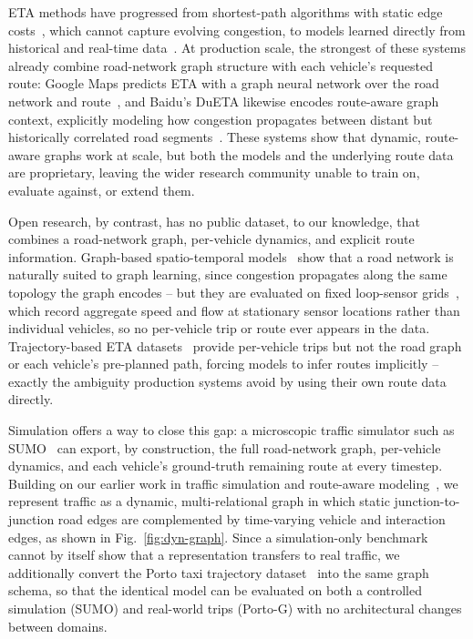 \documentclass[pdflatex,sn-basic,Numbered]{sn-jnl}%
\begin{document}
ETA methods have progressed from shortest-path algorithms with static edge costs~\cite{dijkstra1959}, which cannot capture evolving congestion, to models learned directly from historical and real-time data~\cite{chen2016xgboost,deepTTE2018,wang2022metatte}. At production scale, the strongest of these systems already combine road-network graph structure with each vehicle's requested route: Google Maps predicts ETA with a graph neural network over the road network and route~\cite{derrowpinion2021googlemaps}, and Baidu's DuETA likewise encodes route-aware graph context, explicitly modeling how congestion propagates between distant but historically correlated road segments~\cite{dueta2023}. These systems show that dynamic, route-aware graphs work at scale, but both the models and the underlying route data are proprietary, leaving the wider research community unable to train on, evaluate against, or extend them.

Open research, by contrast, has no public dataset, to our knowledge, that combines a road-network graph, per-vehicle dynamics, and explicit route information. Graph-based spatio-temporal models~\cite{dcrnn2018,yu2018stgcn,wu2019graphwavenet} show that a road network is naturally suited to graph learning, since congestion propagates along the same topology the graph encodes -- but they are evaluated on fixed loop-sensor grids~\cite{li2018_metrla,pemsbay}, which record aggregate speed and flow at stationary sensor locations rather than individual vehicles, so no per-vehicle trip or route ever appears in the data. Trajectory-based ETA datasets~\cite{nyc_tlc,moreira2013porto,didi2016,zheng2012geolife} provide per-vehicle trips but not the road graph or each vehicle's pre-planned path, forcing models to infer routes implicitly -- exactly the ambiguity production systems avoid by using their own route data directly.

Simulation offers a way to close this gap: a microscopic traffic simulator such as SUMO~\cite{SUMO2018} can export, by construction, the full road-network graph, per-vehicle dynamics, and each vehicle's ground-truth remaining route at every timestep. Building on our earlier work in traffic simulation and route-aware modeling~\cite{voloch2021,SmartSimulativeRoute2025}, we represent traffic as a dynamic, multi-relational graph in which static junction-to-junction road edges are complemented by time-varying vehicle and interaction edges, as shown in Fig.~\ref{fig:dyn-graph}. Since a simulation-only benchmark cannot by itself show that a representation transfers to real traffic, we additionally convert the Porto taxi trajectory dataset~\cite{moreira2013porto} into the same graph schema, so that the identical model can be evaluated on both a controlled simulation (SUMO) and real-world trips (Porto-G) with no architectural changes between domains.
\end{document}
